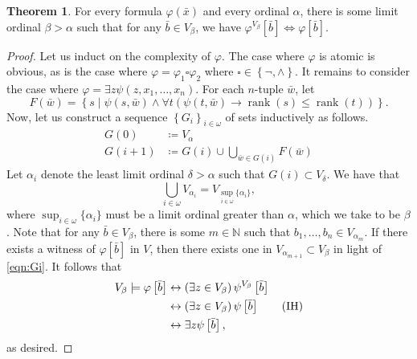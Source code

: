 \documentclass[10pt,letterpaper,cm]{nupset}
\theoremstyle{definition}
\theoremstyle{theorem}
\newtheorem{theorem}[definition]{Theorem}
\theoremstyle{remark}
\newcommand{\N}{\mathbb N}
\newcommand{\1}{\mathbf{1}}
\newcommand{\0}{\vec 0}
\DeclareMathOperator{\rnk}{rank}
\begin{document}
\begin{theorem}\label{RP'}
For every formula $\varphi(\bar{x})$ and every ordinal $\alpha$, there is some limit ordinal $\beta > \alpha$ such that for any $\bar{b} \in V_{\beta}$, we have $\varphi^{V_{\beta}}\left[\bar{b}\right] \iff \varphi\left[\bar{b}\right]$.
\end{theorem}
\begin{proof}
Let us induct on the complexity of $\varphi$. The case where $\varphi$ is atomic is obvious, as is the case where $\varphi   = \varphi_1 \square \varphi_2$ where $\square \in \left\{\neg, \land\right\}$.   It remains to consider the case where $\varphi = \exists{z}\psi(z, x_1, \ldots, x_n)$. For each $n$-tuple $\bar{w}$, let 
\[
F(\bar{w}) =\left\{s\mid \psi(s, \bar{w}) \land \forall{t}(\psi(t, \bar{w}) \rightarrow \rnk(s) \leq \rnk(t))\right\}
.\] Now, let us construct a sequence $\left\{G_i\right\}_{i\in \omega}$ of sets inductively as follows.
\begin{align*}
G(0) & \coloneqq V_{\alpha}
\\  \label{eqn:Gi} G(i+1) & \coloneqq   G(i) \cup \bigcup_{\bar{w} \in G(i)}F(\bar{w}) \tag{$\ast$}
\end{align*}
Let $\alpha_i$ denote the least limit ordinal $\delta>\alpha $ such that $G(i) \subset V_{\delta}$. We have that
\[
\bigcup_{i\in \omega}V_{\alpha_i} = V_{\sup_{i \in \omega}\{\alpha_i\}},
\]
where $\sup_{i \in \omega}\{\alpha_i\}$ must be a limit ordinal greater than $\alpha$, which we take to be $\beta$. Note that for any $\bar{b}\in V_{\beta}$, there is some $m\in \N$ such that $b_1, \ldots, b_n \in V_{\alpha_m}$. If there exists a witness of $\varphi\left[\bar{b}\right]$ in $V$, then there exists one in $V_{\alpha_{m+1}}\subset V_{\beta}$ in light of \eqref{eqn:Gi}.  It follows that
\begin{align*}
V_{\beta} \models \varphi\left[\bar{b}\right] & \leftrightarrow \left(\exists{z\in V_{\beta}}\right)\psi^{V_{\beta}}\left[\bar{b}\right]
\\ & \leftrightarrow  \left(\exists{z\in V_{\beta}}\right)\psi\left[\bar{b}\right] \tag{\text{IH}}
\\ & \leftrightarrow  \exists{z}\psi\left[\bar{b}\right]
,
\end{align*} as desired.

\end{proof}
\end{document}
